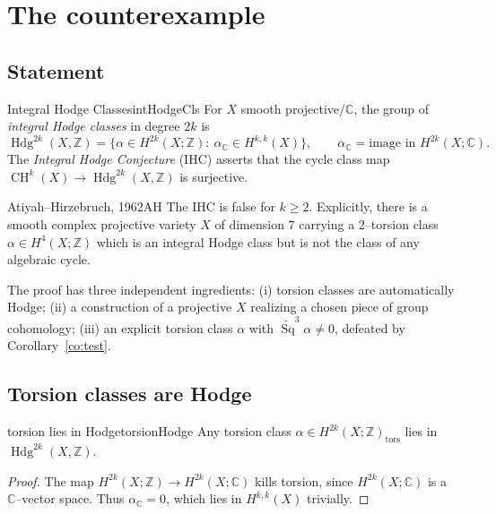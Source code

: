 \documentclass{article}
\newcommand{\C}{{\mathbb{C}}}
\newcommand{\Z}{{\mathbb{Z}}}
\DeclareMathOperator{\Sq}{Sq}
\DeclareMathOperator{\CH}{CH}
\DeclareMathOperator{\Hdg}{Hdg}
\begin{document}
\section{The counterexample}

\subsection{Statement}

\begin{defn}{Integral Hodge Classes}{intHodgeCls}
For $X$ smooth projective$/\C$, the group of \emph{integral Hodge classes} in
degree $2k$ is
\[
  \Hdg^{2k}(X,\Z)=\big\{\alpha\in H^{2k}(X;\Z):\ \alpha_\C\in H^{k,k}(X)\big\},
  \qquad \alpha_\C=\text{image in }H^{2k}(X;\C).
\]
The \emph{Integral Hodge Conjecture} (IHC) asserts that the cycle class map
$\CH^k(X)\to \Hdg^{2k}(X,\Z)$ is surjective.
\end{defn}

\begin{thm}{Atiyah--Hirzebruch, 1962}{AH}
The IHC is false for $k\ge 2$. Explicitly, there is a smooth complex projective
variety $X$ of dimension $7$ carrying a $2$--torsion class
$\alpha\in H^4(X;\Z)$ which is an integral Hodge class but is not the class of any
algebraic cycle.
\end{thm}

The proof has three independent ingredients: (i) torsion classes are automatically
Hodge; (ii) a construction of a projective $X$ realizing a chosen piece of group
cohomology; (iii) an explicit torsion class $\alpha$ with
$\widetilde{\Sq}^3\alpha\neq 0$, defeated by Corollary~\ref{co:test}.

\subsection{Torsion classes are Hodge}

\begin{lem}{torsion lies in Hodge}{torsionHodge}
Any torsion class $\alpha\in H^{2k}(X;\Z)_{\mathrm{tors}}$ lies in
$\Hdg^{2k}(X,\Z)$.
\end{lem}

\begin{proof}
The map $H^{2k}(X;\Z)\to H^{2k}(X;\C)$ kills torsion, since $H^{2k}(X;\C)$ is a
$\C$--vector space. Thus $\alpha_\C=0$, which lies in $H^{k,k}(X)$ trivially.
\end{proof}
\end{document}
